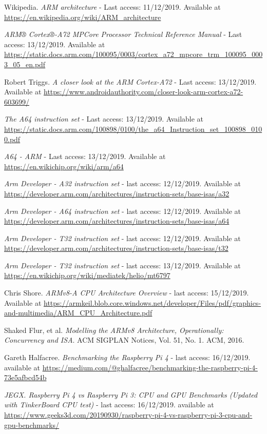 \documentclass[12pt]{article}
\begin{document}
\newpage
\begin{thebibliography}{9}
Wikipedia.
\textit{ARM architecture} - Last access: 11/12/2019. Available at \url{https://en.wikipedia.org/wiki/ARM_architecture} 

\textit{ARM® Cortex®-A72 MPCore Processor Technical Reference Manual} - Last access: 13/12/2019. Available at \url{https://static.docs.arm.com/100095/0003/cortex_a72_mpcore_trm_100095_0003_05_en.pdf}
 
Robert Triggs. \textit{A closer look at the ARM Cortex-A72} - Last access: 13/12/2019. Available at \url{https://www.androidauthority.com/closer-look-arm-cortex-a72-603699/}

\textit{The A64 instruction set} - Last access: 13/12/2019. Available at \url{https://static.docs.arm.com/100898/0100/the_a64_Instruction_set_100898_0100.pdf}

\textit{A64 - ARM} - Last access: 13/12/2019. Available at \url{https://en.wikichip.org/wiki/arm/a64}

\textit{Arm Developer - A32 instruction set} - last access: 12/12/2019. Available at \url{https://developer.arm.com/architectures/instruction-sets/base-isas/a32}

\textit{Arm Developer - A64 instruction set} - last access: 12/12/2019. Available at \url{https://developer.arm.com/architectures/instruction-sets/base-isas/a64}

\textit{Arm Developer - T32 instruction set} - last access: 12/12/2019. Available at \url{https://developer.arm.com/architectures/instruction-sets/base-isas/t32}


\textit{Arm Developer - T32 instruction set} - last access: 13/12/2019. Available at \url{https://en.wikichip.org/wiki/mediatek/helio/mt6797}

Chris Shore. \textit{ARMv8-A CPU Architecture Overview} - last access: 15/12/2019. Available at \url{https://armkeil.blob.core.windows.net/developer/Files/pdf/graphics-and-multimedia/ARM_CPU_Architecture.pdf}

Shaked Flur, et al. \textit{Modelling the ARMv8 Architecture, Operationally: Concurrency and ISA}. ACM SIGPLAN Notices, Vol. 51, No. 1. ACM, 2016.

Gareth Halfacree. \textit{Benchmarking the Raspberry Pi 4} - last access: 16/12/2019. available at \url{https://medium.com/@ghalfacree/benchmarking-the-raspberry-pi-4-73e5afbcd54b}

\textit{JEGX. Raspberry Pi 4 vs Raspberry Pi 3: CPU and GPU Benchmarks (Updated with TinkerBoard CPU test)} - last access: 16/12/2019. available at \url{https://www.geeks3d.com/20190930/raspberry-pi-4-vs-raspberry-pi-3-cpu-and-gpu-benchmarks/}

\end{thebibliography}
\end{document}
